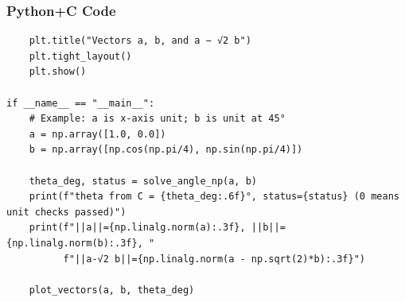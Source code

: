 \documentclass{beamer}
\begin{document}
    \begin{frame}[fragile]
    \frametitle{Python+C Code}
    \begin{lstlisting}
    plt.title("Vectors a, b, and a − √2 b")
    plt.tight_layout()
    plt.show()

if __name__ == "__main__":
    # Example: a is x-axis unit; b is unit at 45°
    a = np.array([1.0, 0.0])
    b = np.array([np.cos(np.pi/4), np.sin(np.pi/4)])

    theta_deg, status = solve_angle_np(a, b)
    print(f"theta from C = {theta_deg:.6f}°, status={status} (0 means unit checks passed)")
    print(f"||a||={np.linalg.norm(a):.3f}, ||b||={np.linalg.norm(b):.3f}, "
          f"||a-√2 b||={np.linalg.norm(a - np.sqrt(2)*b):.3f}")

    plot_vectors(a, b, theta_deg)

    \end{lstlisting}
    \end{frame}
\end{document}
